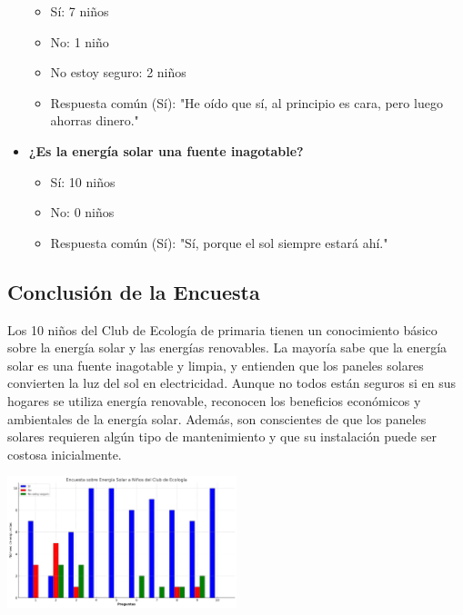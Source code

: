 \documentclass[12pt]{article}
\begin{document}
\begin{itemize}
            \begin{itemize}
                  \item Sí: 7 niños
                  \item No: 1 niño
                  \item No estoy seguro: 2 niños
                  \item Respuesta común (Sí): "He oído que sí, al principio es cara, pero luego ahorras dinero."
            \end{itemize}
      \item \textbf{¿Es la energía solar una fuente inagotable?}
            \begin{itemize}
                  \item Sí: 10 niños
                  \item No: 0 niños
                  \item Respuesta común (Sí): "Sí, porque el sol siempre estará ahí."
            \end{itemize}
\end{itemize}

\subsection{Conclusión de la Encuesta}
Los 10 niños del Club de Ecología de primaria tienen un conocimiento básico sobre la energía solar y las energías renovables. La mayoría sabe que la energía solar es una fuente inagotable y limpia, y entienden que los paneles solares convierten la luz del sol en electricidad. Aunque no todos están seguros si en sus hogares se utiliza energía renovable, reconocen los beneficios económicos y ambientales de la energía solar. Además, son conscientes de que los paneles solares requieren algún tipo de mantenimiento y que su instalación puede ser costosa inicialmente.

\begin{center}
      \includegraphics[width=0.5\textwidth]{imagenes/graph.png}
\end{center}
\newpage
\nocite{*}
\newpage
\end{document}
